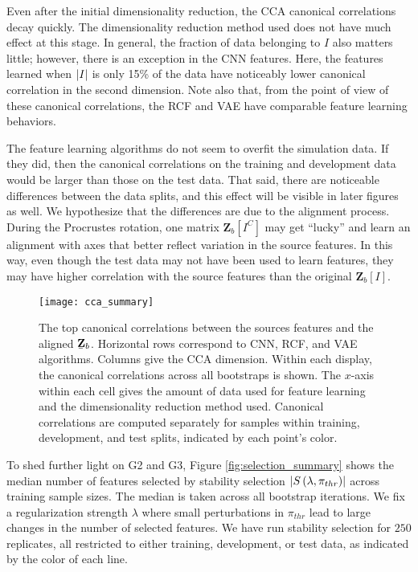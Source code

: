 Even after the initial dimensionality reduction, the CCA canonical correlations
decay quickly. The dimensionality reduction method used does not have much
effect at this stage. In general, the fraction of data belonging to $I$ also
matters little; however, there is an exception in the CNN features. Here, the
features learned when $\left|I\right|$ is only 15\% of the data have noticeably
lower canonical correlation in the second dimension. Note also that, from the
point of view of these canonical correlations, the RCF and VAE have comparable
feature learning behaviors.

The feature learning algorithms do not seem to overfit the simulation data. If
they did, then the canonical correlations on the training and development data
would be larger than those on the test data. That said, there are noticeable
differences between the data splits, and this effect will be visible in later
figures as well. We hypothesize that the differences are due to the alignment
process. During the Procrustes rotation, one matrix
$\mathbf{Z}_{b}\left[I^{C}\right]$ may get ``lucky'' and learn an alignment with
axes that better reflect variation in the source features. In this way, even
though the test data may not have been used to learn features, they may have
higher correlation with the source features than the original
$\mathbf{Z}_{b}\left[I\right]$.

\begin{figure}
  \centering
  \texttt{[image: cca\_summary]}
  \caption{The top canonical correlations between the sources features and the
    aligned $\protect\underaccent{\bar}{\mathbf{Z}}_{b}$. Horizontal rows
    correspond to CNN, RCF, and VAE algorithms. Columns give the CCA dimension.
    Within each display, the canonical correlations across all bootstraps is
    shown. The $x$-axis within each cell gives the amount of data used for
    feature learning and the dimensionality reduction method used. Canonical
    correlations are computed separately for samples within training,
    development, and test splits, indicated by each point's color.}
  \label{fig:cca_summary}
\end{figure}

To shed further light on G2 and G3, Figure \ref{fig:selection_summary} shows
the median number of features selected by stability selection
$\left|S\left(\lambda, \pi_{thr}\right)\right|$ across training sample sizes. The
median is taken across all bootstrap iterations. We fix a regularization
strength $\lambda$ where small perturbations in $\pi_{thr}$ lead to large
changes in the number of selected features. We have run stability selection for
$250$ replicates, all restricted to either training, development, or test data,
as indicated by the color of each line.

